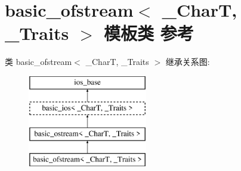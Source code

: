\hypertarget{classbasic__ofstream}{}\section{basic\+\_\+ofstream$<$ \+\_\+\+CharT, \+\_\+\+Traits $>$ 模板类 参考}
\label{classbasic__ofstream}
类 basic\+\_\+ofstream$<$ \+\_\+\+CharT, \+\_\+\+Traits $>$ 继承关系图\+:\begin{figure}[H]
\begin{center}
\leavevmode
\includegraphics[height=4.000000cm]{classbasic__ofstream}
\end{center}
\end{figure}
